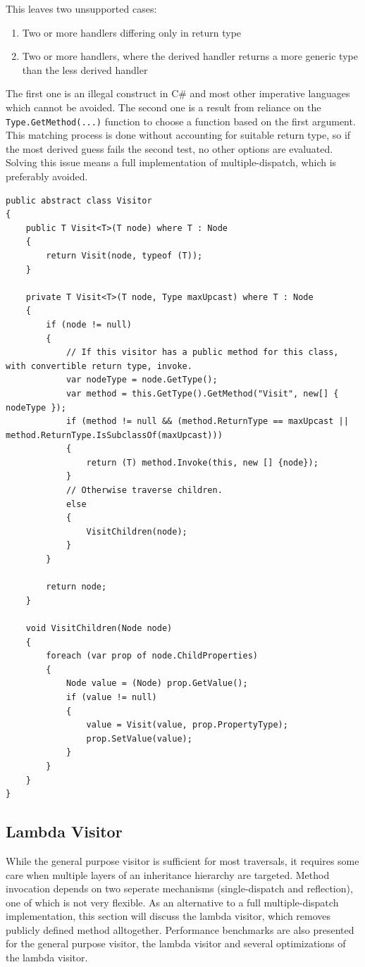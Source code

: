 \documentclass[twoside,openright]{uva-bachelor-thesis}
\newcommand{\code}[1]{\texttt{\footnotesize#1}}
\begin{document}
			This leaves two unsupported cases:
			\begin{enumerate}
				\item Two or more handlers differing only in return type
				\item Two or more handlers, where the derived handler returns a more generic type than the less derived handler
			\end{enumerate}
			
			The first one is an illegal construct in C\# and most other imperative languages which cannot be avoided. The second one is a result from reliance on the \code{Type.GetMethod(...)} function to choose a function based on the first argument. This matching process is done without accounting for suitable return type, so if the most derived guess fails the second test, no other options are evaluated. Solving this issue means a full implementation of multiple-dispatch, which is preferably avoided.
						
			\begin{lstlisting}[caption=Generalized visitor,label=gen-visit]
public abstract class Visitor
{
	public T Visit<T>(T node) where T : Node
	{
		return Visit(node, typeof (T));
	}
	
	private T Visit<T>(T node, Type maxUpcast) where T : Node
	{
		if (node != null)
		{
			// If this visitor has a public method for this class, with convertible return type, invoke.
			var nodeType = node.GetType();
			var method = this.GetType().GetMethod("Visit", new[] { nodeType });
			if (method != null && (method.ReturnType == maxUpcast || method.ReturnType.IsSubclassOf(maxUpcast)))
			{
				return (T) method.Invoke(this, new [] {node});
			}	
			// Otherwise traverse children.
			else
			{		
				VisitChildren(node);
			}
		}
		
		return node;
	}
	
	void VisitChildren(Node node)
	{
		foreach (var prop of node.ChildProperties)
		{
			Node value = (Node) prop.GetValue();
			if (value != null)
			{
				value = Visit(value, prop.PropertyType);
				prop.SetValue(value);
			}
		}
	}
}
			\end{lstlisting}
			
		\subsection{Lambda Visitor}
			While the general purpose visitor is sufficient for most traversals, it requires some care when multiple layers of an inheritance hierarchy are targeted. Method invocation depends on two seperate mechanisms (single-dispatch and reflection), one of which is not very flexible. As an alternative to a full multiple-dispatch implementation, this section will discuss the lambda visitor, which removes publicly defined method alltogether. Performance benchmarks are also presented for the general purpose visitor, the lambda visitor and several optimizations of the lambda visitor.
			
\end{document}
